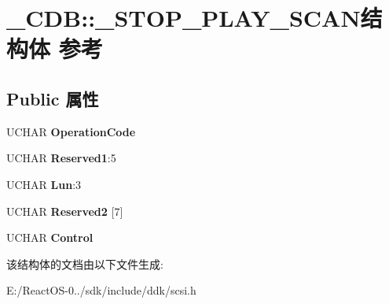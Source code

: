 \hypertarget{struct___c_d_b_1_1___s_t_o_p___p_l_a_y___s_c_a_n}{}\section{\+\_\+\+C\+DB\+:\+:\+\_\+\+S\+T\+O\+P\+\_\+\+P\+L\+A\+Y\+\_\+\+S\+C\+A\+N结构体 参考}
\label{struct___c_d_b_1_1___s_t_o_p___p_l_a_y___s_c_a_n}
\subsection*{Public 属性}
\begin{DoxyCompactItemize}
\item 
\mbox{\label{struct___c_d_b_1_1___s_t_o_p___p_l_a_y___s_c_a_n_ab354e96b4375287df6d85e8275d10ae4}} 
U\+C\+H\+AR {\bfseries Operation\+Code}
\item 
\mbox{\label{struct___c_d_b_1_1___s_t_o_p___p_l_a_y___s_c_a_n_a25f077febd890af13778c2250c3a31e5}} 
U\+C\+H\+AR {\bfseries Reserved1}\+:5
\item 
\mbox{\label{struct___c_d_b_1_1___s_t_o_p___p_l_a_y___s_c_a_n_ae72089b1110b1bddc5abd0817a7affac}} 
U\+C\+H\+AR {\bfseries Lun}\+:3
\item 
\mbox{\label{struct___c_d_b_1_1___s_t_o_p___p_l_a_y___s_c_a_n_a927b4d3325f196abaff3ce1d19969ef9}} 
U\+C\+H\+AR {\bfseries Reserved2} \mbox{[}7\mbox{]}
\item 
\mbox{\label{struct___c_d_b_1_1___s_t_o_p___p_l_a_y___s_c_a_n_a86f2fa668d18534d5d210c5ff01ef82c}} 
U\+C\+H\+AR {\bfseries Control}
\end{DoxyCompactItemize}


该结构体的文档由以下文件生成\+:\begin{DoxyCompactItemize}
\item 
E\+:/\+React\+O\+S-\/0../sdk/include/ddk/scsi.\+h\end{DoxyCompactItemize}
